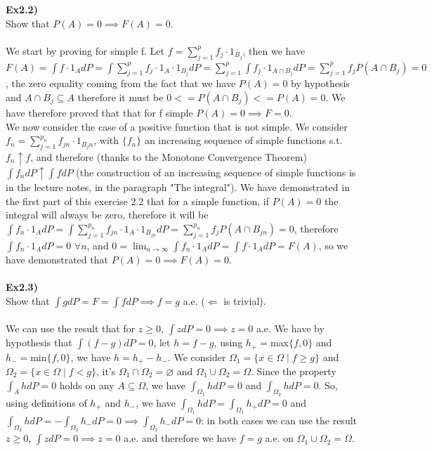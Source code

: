 \documentclass[12pt,mythesisstyle]{report}
\begin{document}
\textbf{Ex2.2)}\\
Show that $P(A)=0\implies F(A)=0$.
\\
\\We start by proving for simple f. Let $f=\sum_{j=1}^p f_j\cdot 1_{B_j}$, then we have $F(A)=\int f\cdot 1_{A}dP=\int \sum_{j=1}^p f_j\cdot 1_A\cdot 1_{B_j}dP=\sum_{j=1}^p \int f_j\cdot 1_{A\cap B_j}dP=\sum_{j=1}^p f_jP(A\cap B_j)=0$, the zero equality coming from the fact that we have $P(A)=0$ by hypothesis and $A\cap B_j\subseteq A$ therefore it must be $0<=P(A\cap B_j)<=P(A)=0$. We have therefore proved that that for f simple $P(A)=0\implies F=0$.
\\We now consider the case of a positive function that is not simple. We consider $f_n=\sum_{j=1}^{p_n} f_{jn}\cdot 1_{B_jn}$, with $\{f_n\}$ an increasing sequence of simple functions s.t. $f_n\uparrow f$, and therefore (thanks to the Monotone Convergence Theorem) $\int f_ndP\uparrow\int fdP$ (the construction of an increasing sequence of simple functions is in the lecture notes, in the paragraph "The integral"). We have demonstrated in the first part of this exercise 2.2 that for a simple function, if $P(A)=0$ the integral will always be zero, therefore it will be $\int f_n\cdot 1_{A}dP=\int \sum_{j=1}^{p_n} f_{jn}\cdot 1_A\cdot 1_{B_{jn}}dP=\sum_{j=1}^{p_n} f_jP(A\cap B_{jn})=0$, therefore $\int f_n\cdot 1_{A}dP=0$ $\forall n$, and $0=\lim_{n \to \infty}\int f_n\cdot 1_{A}dP=\int f\cdot 1_{A}dP=F(A)$, so we have demonstrated that $P(A)=0\implies F(A)=0$.
\\\\
\textbf{Ex2.3)}\\
Show that $\int gdP=F=\int fdP\implies f=g$ a.e. ($\Longleftarrow$ is trivial).
\\\\
We can use the result that for $z\geq 0$, $\int zdP=0 \implies z=0$ a.e. We have by hypothesis that $\int (f-g)dP=0$, let $h=f-g$, using $h_+=$max$\{f,0\}$ and $h_-=$min$\{f,0\}$, we have $h=h_+-h_-$. We consider $\Omega_1=\{x\in\Omega \mid f\geq g\}$ and $\Omega_2=\{x\in\Omega \mid f<g\}$, it's $\Omega_1\cap\Omega_2=\varnothing$ and $\Omega_1\cup\Omega_2=\Omega$. Since the property $\int_A hdP=0$ holds on any $A\subseteq\Omega$, we have $\int_{\Omega_1} hdP=0$ and $\int_{\Omega_2} hdP=0$. So, using definitions of $h_+$ and $h_-$, we have $\int_{\Omega_1} hdP=\int_{\Omega_1} h_+dP=0$ and $\int_{\Omega_2} hdP=-\int_{\Omega_2} h_-dP=0\implies\int_{\Omega_2} h_-dP=0$: in both cases we can use the result $z\geq 0$, $\int zdP=0 \implies z=0$ a.e. and therefore we have $f=g$ a.e. on $\Omega_1\cup\Omega_2=\Omega$.
\end{document}
